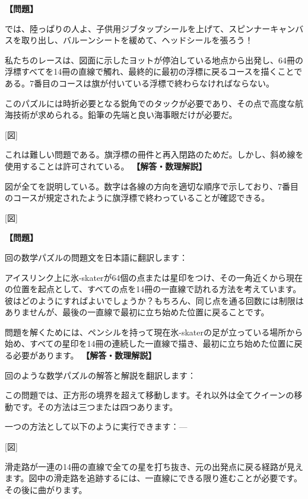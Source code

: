 \documentclass[10pt,a4paper,oneside,openany]{ltjsbook}
\begin{document}
\begin{tcolorbox}[colback=softblue,colframe=primaryblue,title=\textbf{第 330 問：ヨットレース （原題: THE YACHT RACE.）},arc=2mm,boxrule=1pt,breakable]
\textbf{【問題】}\par\vspace{0.3em}
では、陸っぱりの人よ、子供用ジブタップシールを上げて、スピンナーキャンバスを取り出し、バルーンシートを緩めて、ヘッドシールを張ろう！

私たちのレースは、図面に示したヨットが停泊している地点から出発し、64冊の浮標すべてを14冊の直線で觸れ、最終的に最初の浮標に戻るコースを描くことである。7番目のコースは旗が付いている浮標で終わらなければならない。

このパズルには時折必要となる鋭角でのタックが必要であり、その点で高度な航海技術が求められる。鉛筆の先端と良い海事眼だけが必要だ。

[図]

これは難しい問題である。旗浮標の冊件と再入閉路のためだ。しかし、斜め線を使用することは許可されている。
\tcblower
\textbf{【解答・数理解説】}\par\vspace{0.3em}
図が全てを説明している。数字は各線の方向を適切な順序で示しており、7番目のコースが規定されたように旗浮標で終わっていることが確認できる。

[図]
\end{tcolorbox}

\begin{tcolorbox}[colback=softblue,colframe=primaryblue,title=\textbf{第 331 問：THE SCIENTIFIC SKATER.},arc=2mm,boxrule=1pt,breakable]
\textbf{【問題】}\par\vspace{0.3em}
回の数学パズルの問題文を日本語に翻訳します：

アイスリンク上に氷-skaterが64個の点または星印をつけ、その一角近くから現在の位置を起点として、すべての点を14冊の一直線で訪れる方法を考えています。彼はどのようにすればよいでしょうか？もちろん、同じ点を通る回数には制限はありませんが、最後の一直線で最初に立ち始めた位置に戻ることです。

問題を解くためには、ペンシルを持って現在氷-skaterの足が立っている場所から始め、すべての星印を14冊の連続した一直線で描き、最初に立ち始めた位置に戻る必要があります。
\tcblower
\textbf{【解答・数理解説】}\par\vspace{0.3em}
回のような数学パズルの解答と解説を翻訳します：

この問題では、正方形の境界を超えて移動します。それ以外は全てクイーンの移動です。その方法は三つまたは四つあります。

一つの方法として以下のように実行できます：—

[図]

滑走路が一連の14冊の直線で全ての星を打ち抜き、元の出発点に戻る経路が見えます。図中の滑走路を追跡するには、一直線にできる限り進むことが必要です。その後に曲がります。
\end{tcolorbox}
\end{document}
